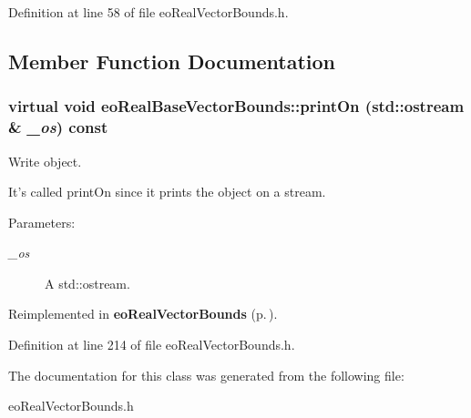 Definition at line 58 of file eo\-Real\-Vector\-Bounds.h.

\subsection{Member Function Documentation}
\subsubsection{\setlength{\rightskip}{0pt plus 5cm}virtual void eo\-Real\-Base\-Vector\-Bounds::print\-On (std::ostream \& {\em \_\-os}) const\hspace{0.3cm}{\tt  [inline, virtual]}}\label{classeo_real_base_vector_bounds_a22}


Write object. 

It's called print\-On since it prints the object on a stream. \begin{Desc}
\item[Parameters:]
\begin{description}
\item[{\em \_\-os}]A std::ostream. \end{description}
\end{Desc}


Reimplemented in {\bf eo\-Real\-Vector\-Bounds} {\rm (p.\,\pageref{classeo_real_vector_bounds_a9})}.

Definition at line 214 of file eo\-Real\-Vector\-Bounds.h.

The documentation for this class was generated from the following file:\begin{CompactItemize}
\item 
eo\-Real\-Vector\-Bounds.h\end{CompactItemize}
